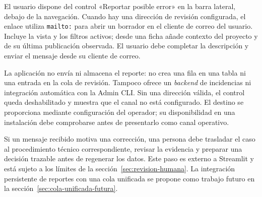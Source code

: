 \label{sec:reporte-publico}
El usuario dispone del control «Reportar posible error» en la barra lateral,
debajo de la navegación. Cuando hay una dirección de revisión configurada,
el enlace utiliza \texttt{mailto:} para abrir un borrador en el cliente de
correo del usuario. Incluye la vista y los filtros activos; desde una ficha
añade contexto del proyecto y de su última publicación observada. El usuario
debe completar la descripción y enviar el mensaje desde su cliente de correo.

La aplicación no envía ni almacena el reporte: no crea una fila en una tabla
ni una entrada en la cola de revisión. Tampoco ofrece un \emph{backend} de incidencias
ni integración automática con la Admin CLI. Sin una dirección válida,
el control queda deshabilitado y muestra que el canal no está configurado.
El destino se proporciona mediante configuración del operador; su disponibilidad
en una instalación debe comprobarse antes de presentarlo como canal operativo.

Si un mensaje recibido motiva una corrección, una persona debe trasladar el
caso al procedimiento técnico correspondiente, revisar la evidencia y preparar
una decisión trazable antes de regenerar los datos. Este paso es externo a
Streamlit y está sujeto a los límites de la sección~\ref{sec:revision-humana}.
La integración persistente de reportes con una cola unificada se propone
como trabajo futuro en la sección~\ref{sec:cola-unificada-futura}.
